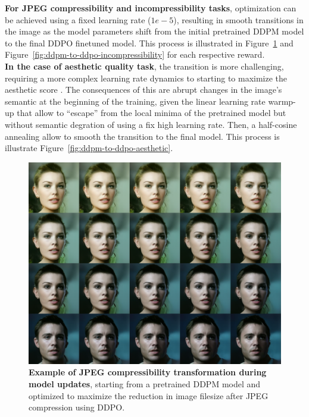\noindent \textbf{For JPEG compressibility and incompressibility tasks}, optimization can be achieved using a fixed learning rate ($1e-5$), resulting in smooth transitions in the image as the model parameters shift from the initial  pretrained DDPM model to the final DDPO finetuned model. This process is  illustrated in Figure~\ref{fig:ddpm-to-ddpo-compressibility} and Figure~\ref{fig:ddpm-to-ddpo-incompressibility} for each respective reward. \\

\noindent \textbf{In the case of aesthetic quality task}, the transition is more challenging, requiring a more complex learning rate dynamics to starting to maximize the aesthetic score . The consequences of this are abrupt changes in the image's semantic at the beginning of the training, given the linear learning rate warmp-up that allow  to ``escape'' from the local minima of the pretrained model but without semantic degration of using a fix high learning rate. Then, a half-cosine annealing allow to smooth the transition to the final model. This process is illustrate Figure~\ref{fig:ddpm-to-ddpo-aesthetic}. \\


\begin{figure}[ht]
  \centering
  \includegraphics[scale=1.40]{img/results/compressibility_6.png}
  \vspace{-0pt}  %
    \captionsetup{width=\textwidth} %
    \caption{\textbf{Example of JPEG compressibility transformation during model updates}, starting from a pretrained DDPM model and optimized to maximize the reduction in image filesize after JPEG compression using DDPO.}
    \label{fig:ddpm-to-ddpo-compressibility}
\end{figure}

